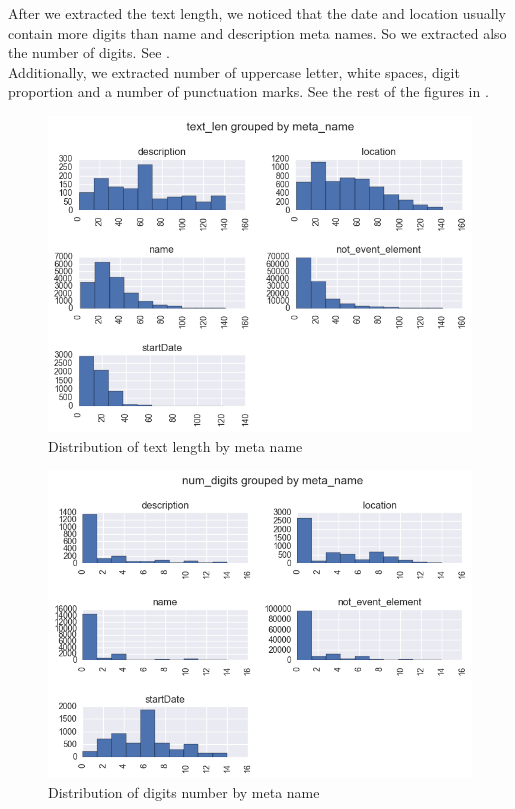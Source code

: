 After we extracted the text length, we noticed that the date and location usually contain more digits than name and description meta names. So we extracted also the number of digits. See .\\

Additionally, we extracted number of uppercase letter, white spaces, digit proportion and a number of punctuation marks. See the rest of the figures in .

\begin{figure}[h]
\begin{center}
\includegraphics[width=1.0\textwidth]{figures07/distrTextByMeta}
\caption{Distribution of text length by meta name}
\label{fig:distrTextByMeta}
\end{center}
\end{figure}

\begin{figure}[h]
\begin{center}
\includegraphics[width=1.0\textwidth]{figures07/distrDigitsByMeta}
\caption{Distribution of digits number by meta name}
\label{fig:distrDigitsByMeta}
\end{center}
\end{figure}

